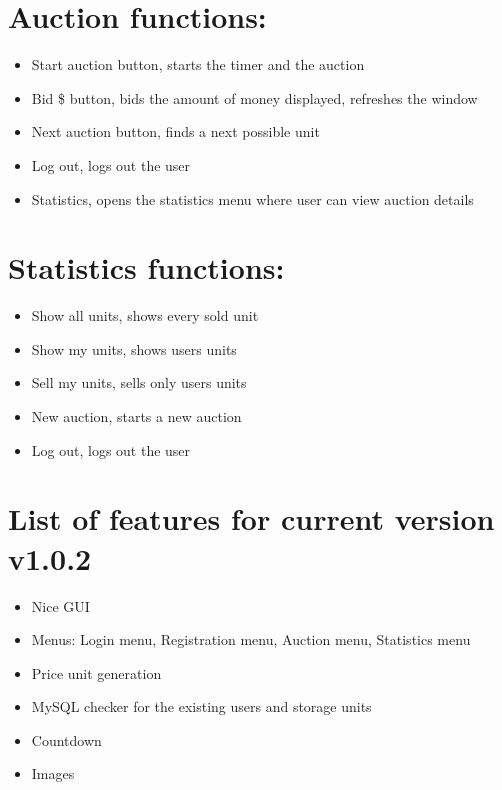 \documentclass[
]{report}
\providecommand{\tightlist}{%
  \setlength{\itemsep}{0pt}\setlength{\parskip}{0pt}}
\begin{document}
\hypertarget{auction-functions}{%
\section{Auction functions:}\label{auction-functions}}

\begin{itemize}
\tightlist
\item
  Start auction button, starts the timer and the auction
\item
  Bid \$ button, bids the amount of money displayed, refreshes the
  window
\item
  Next auction button, finds a next possible unit
\item
  Log out, logs out the user
\item
  Statistics, opens the statistics menu where user can view auction details
\end{itemize}

\hypertarget{statistics-functions}{%
\section{Statistics functions:}\label{statistics-functions}}

\begin{itemize}
\tightlist
\item
  Show all units, shows every sold unit
\item
  Show my units, shows users units
\item
  Sell my units, sells only users units
\item
  New auction, starts a new auction
\item
  Log out, logs out the user
\end{itemize}

\hypertarget{list-of-features-for-current-version-v1.0.2}{%
\section{List of features for current version v1.0.2}\label{list-of-features-for-current-version-v1.0.2}}

\begin{itemize}
\tightlist
\item
  Nice GUI
\item
  Menus: Login menu, Registration menu, Auction menu, Statistics menu
\item
  Price unit generation
\item
  MySQL checker for the existing users and storage units
\item
  Countdown
\item
  Images
\end{itemize}
\end{document}
